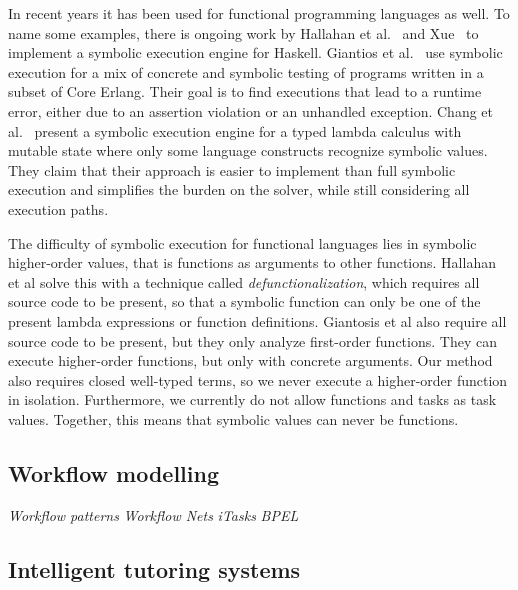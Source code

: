 In recent years it has been used for functional programming languages as well.
To name some examples, there is ongoing work by Hallahan et al.~\cite{HallahanXP2017} and Xue~\cite{Xue2019} to implement a symbolic execution engine for Haskell.
Giantios et al.~\cite{GiantsiosPS2017} use symbolic execution for a mix of concrete and symbolic testing of programs written in a subset of Core Erlang.
Their goal is to find executions that lead to a runtime error, either due to an assertion violation or an unhandled exception.
Chang et al.~\cite{ChangKT2018} present a symbolic execution engine for a typed lambda calculus with mutable state where only some language constructs recognize symbolic values.
They claim that their approach is easier to implement than full symbolic execution and simplifies the burden on the solver, while still considering all execution paths.

The difficulty of symbolic execution for functional languages lies in symbolic higher-order values, that is functions as arguments to other functions.
Hallahan et al solve this with a technique called \emph{defunctionalization}, which requires all source code to be present, so that a symbolic function can only be one of the present lambda expressions or function definitions.
Giantosis et al also require all source code to be present, but they only analyze first-order functions.
They can execute higher-order functions, but only with concrete arguments.
Our method also requires closed well-typed terms, so we never execute a higher-order function in isolation.
Furthermore, we currently do not allow functions and tasks as task values.
Together, this means that symbolic values can never be functions.

\subsection{Workflow modelling}

\emph{Workflow patterns}
\emph{Workflow Nets}
\emph{iTasks}
\emph{BPEL}
%


\subsection{Intelligent tutoring systems}
